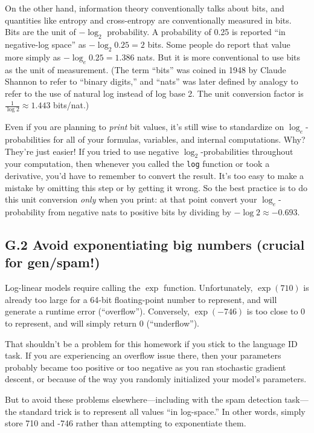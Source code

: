 On the other hand, information theory conventionally talks about bits, and quantities like entropy and cross-entropy are conventionally measured in bits. Bits are the unit of $-\log_2$ probability. A probability of 0.25 is reported “in negative-log space” as $-\log_2 0.25 = 2$ bits. Some people do report that value more simply as $-\log_e 0.25 = 1.386$ nats. But it is more conventional to use bits as the unit of measurement. (The term “bits” was coined in 1948 by Claude Shannon to refer to “binary digits,” and “nats” was later defined by analogy to refer to the use of natural log instead of log base 2. The unit conversion factor is $\frac{1}{\log 2} \approx 1.443$ bits/nat.)  

Even if you are planning to \textit{print} bit values, it’s still wise to standardize on $\log_e$-probabilities for all of your formulas, variables, and internal computations. Why? They’re just easier! If you tried to use negative $\log_2$-probabilities throughout your computation, then whenever you called the \texttt{log} function or took a derivative, you’d have to remember to convert the result. It’s too easy to make a mistake by omitting this step or by getting it wrong. So the best practice is to do this unit conversion \textit{only} when you print: at that point convert your $\log_e$-probability from negative nats to positive bits by dividing by $-\log 2 \approx -0.693$.

\subsection*{G.2 Avoid exponentiating big numbers (crucial for gen/spam!)}
Log-linear models require calling the $\exp$ function. Unfortunately, $\exp(710)$ is already too large for a 64-bit floating-point number to represent, and will generate a runtime error (“overflow”). Conversely, $\exp(-746)$ is too close to 0 to represent, and will simply return 0 (“underflow”).  

That shouldn’t be a problem for this homework if you stick to the language ID task. If you are experiencing an overflow issue there, then your parameters probably became too positive or too negative as you ran stochastic gradient descent, or because of the way you randomly initialized your model’s parameters.  

But to avoid these problems elsewhere—including with the spam detection task—the standard trick is to represent all values “in log-space.” In other words, simply store 710 and -746 rather than attempting to exponentiate them.

